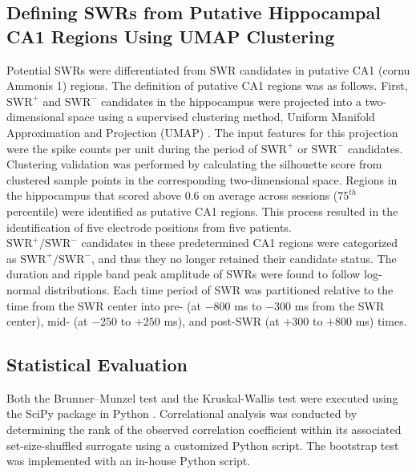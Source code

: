 \subsection{Defining SWRs from Putative Hippocampal CA1 Regions Using UMAP Clustering}
Potential SWRs were differentiated from SWR candidates in putative CA1 (cornu Ammonis 1) regions. The definition of putative CA1 regions was as follows. First, $\textrm{SWR}^+$ and $\textrm{SWR}^-$ candidates in the hippocampus were projected into a two-dimensional space using a supervised clustering method, Uniform Manifold Approximation and Projection (UMAP) \cite{mcinnes_umap_2018}. The input features for this projection were the spike counts per unit during the period of $\textrm{SWR}^+$ or $\textrm{SWR}^-$ candidates. Clustering validation was performed by calculating the silhouette score \cite{rousseeuw_silhouettes_1987} from clustered sample points in the corresponding two-dimensional space. Regions in the hippocampus that scored above 0.6 on average across sessions ($75^{th}$ percentile) were identified as putative CA1 regions. This process resulted in the identification of five electrode positions from five patients.
\\
\indent
$\textrm{SWR}^+/\textrm{SWR}^-$ candidates in these predetermined CA1 regions were categorized as $\textrm{SWR}^+/\textrm{SWR}^-$, and thus they no longer retained their candidate status. The duration and ripple band peak amplitude of SWRs were found to follow log-normal distributions. Each time period of SWR was partitioned relative to the time from the SWR center into pre- (at $-800$ ms to $-300$ ms from the SWR center), mid- (at $-250$ to $+250$ ms), and post-SWR (at $+300$ to $+800$ ms) times.
\\
\indent
\subsection{Statistical Evaluation}
Both the Brunner--Munzel test and the Kruskal-Wallis test were executed using the SciPy package in Python \cite{virtanen_scipy_2020}. Correlational analysis was conducted by determining the rank of the observed correlation coefficient within its associated set-size-shuffled surrogate using a customized Python script. The bootstrap test was implemented with an in-house Python script.
\label{sec:methods}
